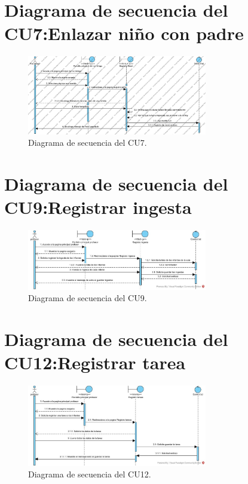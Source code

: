 \section{Diagrama de secuencia del CU7:Enlazar niño con padre}


\begin{figure}[htbp]
\centering
\includegraphics[width=0.7\textwidth]{images/diagramaSecuenciaCU7.png}
\caption{Diagrama de secuencia del CU7.}
\label{fig:diagramaSecuenciaCU7}
\end{figure}

\newpage
\section{Diagrama de secuencia del CU9:Registrar ingesta}

\begin{figure}[htbp]
\centering
\includegraphics[width=0.7\textwidth]{images/diagramasecuencia9.jpg}
\caption{Diagrama de secuencia del CU9.}
\label{fig:diagramasecuencia9}
\end{figure}

\section{Diagrama de secuencia del CU12:Registrar tarea}

\begin{figure}[htbp]
\centering
\includegraphics[width=0.7\textwidth]{images/diagramasecuencia12}
\caption{Diagrama de secuencia del CU12.}
\label{fig:diagramasecuencia12}
\end{figure}

